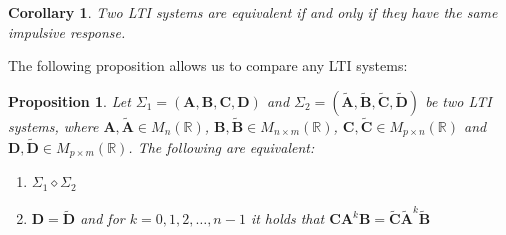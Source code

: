 \documentclass[a4paper,10pt,oneside]{book}
\newtheorem{proposition}[theorem]{Proposition}
\newtheorem{corollary}[theorem]{Corollary}
\begin{document}
\begin{corollary}\label{cor:impulsiveResponse}
 Two LTI systems are equivalent if and only if they have the same impulsive response.
\end{corollary}
\noindent The following proposition allows us to compare any LTI systems:
\begin{proposition}\label{LTI_equiv_criterion_1}
 Let $\Sigma_1=(\mathbf{A},\mathbf{B},\mathbf{C},\mathbf{D})$ and $\Sigma_2=(\tilde{\mathbf{A}},\tilde{\mathbf{B}},\tilde{\mathbf{C}},\tilde{\mathbf{D}})$ be two LTI systems, where $\mathbf{A},\tilde{\mathbf{A}}\in M_n(\mathbb{R})$, $\mathbf{B},\tilde{\mathbf{B}}\in M_{n\times m}(\mathbb{R})$, $\mathbf{C},\tilde{\mathbf{C}}\in M_{p\times n}(\mathbb{R})$ and $\mathbf{D},\tilde{\mathbf{D}}\in M_{p \times m}(\mathbb{R})$. The following are equivalent:
\begin{enumerate}
 \item $\Sigma_1\diamond\Sigma_2$
 \item $\mathbf{D}=\tilde{\mathbf{D}}$ and for $k=0,1,2,\ldots,n-1$ it holds that $\mathbf{CA}^k\mathbf{B}=\tilde{\mathbf{C}}\tilde{\mathbf{A}}^k\tilde{\mathbf{B}}$
\end{enumerate}
\end{proposition}
\end{document}
